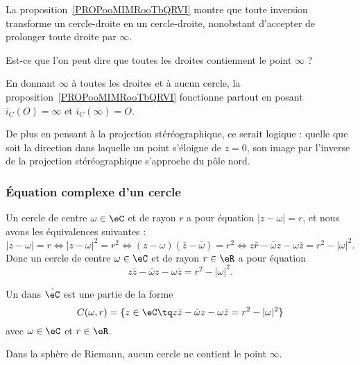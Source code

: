 \begin{probleme}        \label{PROBooZHHTooIFNwxR}
	La proposition~\ref{PROPooMIMRooTbQRVI} montre que toute inversion transforme un cercle-droite en un cercle-droite, nonobstant d'accepter de prolonger toute droite par \( \infty\).

	Est-ce que l'on peut dire que toutes les droites contiennent le point \( \infty\) ?

	En donnant \( \infty\) à toutes les droites et à aucun cercle, la proposition~\ref{PROPooMIMRooTbQRVI} fonctionne partout en posant \( i_C(O)=\infty\) et \( i_C(\infty)=O\).

	De plus en pensant à la projection stéréographique, ce serait logique : quelle que soit la direction dans laquelle un point s'éloigne de \( z=0\), son image par l'inverse de la projection stéréographique s'approche du pôle nord.
\end{probleme}

\subsubsection{Équation complexe d'un cercle}

Un cercle de centre \( \omega\in \eC\) et de rayon \( r\) a pour équation \( | z-\omega |=r\), et nous avons les équivalences suivantes :
\begin{equation}
	| z-\omega |=r\Leftrightarrow | z-\omega |^2=r^2\Leftrightarrow (z-\omega)(\bar z-\bar \omega)=r^2\Leftrightarrow z\bar r-\bar \omega z-\omega \bar z=r^2-| \omega |^2.
\end{equation}
Donc un cercle de centre \( \omega\in \eC\) et de rayon \( r\in \eR\) a pour équation
\begin{equation}        \label{EQooDIFRooKRZZoi}
	z\bar z-\bar\omega z-\omega\bar z=r^2-| \omega |^2.
\end{equation}

\begin{definition}      \label{DEFooAUDJooVqLDhe}
	Un  dans \( \hat\eC\) est une partie de la forme
	\begin{equation}
		C(\omega,r)=\{ z\in \eC\tq z\bar z-\bar\omega z-\omega\bar z=r^2-| \omega |^2 \}
	\end{equation}
	avec \( \omega\in \eC\) et \( r\in \eR\).
\end{definition}
Dans la sphère de Riemann, aucun cercle ne contient le point \( \infty\).

